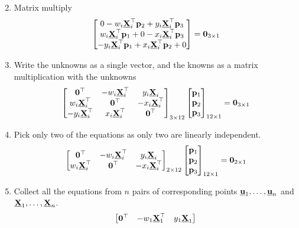 \documentclass{article}
\begin{document}
\begin{enumerate}
\[        \]
      \item Matrix multiply
        \[
          \begin{bmatrix}
            0 -w_i \underline{\mathbf{X}}_i^\top\mathbf{p}_2 + y_i \underline{\mathbf{X}}_i^\top\mathbf{p}_3 \\
            w_i \underline{\mathbf{X}}_i^\top\mathbf{p}_1 + 0  -x_i \underline{\mathbf{X}}_i^\top\mathbf{p}_3 \\
            -y_i \underline{\mathbf{X}}_i^\top\mathbf{p}_1 + x_i \underline{\mathbf{X}}_i^\top\mathbf{p}_2 + 0
          \end{bmatrix} = \mathbf{0}_{3 \times 1}
          \]
        \item Write the unknowns as a single vector, and the knowns as a matrix
          multiplication with the unknowns
          \[
            \begin{bmatrix}
              \mathbf{0}^\top & -w_i \underline{\mathbf{X}}_i^\top & y_i \underline{\mathbf{X}}_i \\
              w_i \underline{\mathbf{X}}_i^\top & \mathbf{0}^\top  & -x_i \underline{\mathbf{X}}_i^\top \\
              -y_i \underline{\mathbf{X}}_i^\top & x_i \underline{\mathbf{X}}_i^\top & \mathbf{0}^\top
              \end{bmatrix}_{3 \times 12}
              \begin{bmatrix}
                \mathbf{p}_1 \\
                \mathbf{p}_2 \\
                \mathbf{p}_3
                \end{bmatrix}_{12 \times 1}
                = \mathbf{0}_{3 \times 1}
            \]
     \item Pick only two of the equations as only two are linearly independent.
       \[
         \begin{bmatrix}
           \mathbf{0}^\top & -w_i \underline{\mathbf{X}}_i^\top & y_i \underline{\mathbf{X}}_i \\
           w_i \underline{\mathbf{X}}_i^\top & \mathbf{0}^\top  & -x_i \underline{\mathbf{X}}_i^\top
         \end{bmatrix}_{2 \times 12}
         \begin{bmatrix}
           \mathbf{p}_1 \\
           \mathbf{p}_2 \\
           \mathbf{p}_3
         \end{bmatrix}_{12 \times 1}
         = \mathbf{0}_{2 \times 1}
       \]
     \item Collect all the equations from $n$ pairs of corresponding points
       $\underline{\mathbf{u}}_1, \dots, \underline{\mathbf{u}}_n$ and $\underline{\mathbf{X}}_1, \dots, \underline{\mathbf{X}}_n$.
       \[
         \begin{bmatrix}
           \mathbf{0}^\top & -w_1 \underline{\mathbf{X}}_1^\top & y_1 \underline{\mathbf{X}}_1 \\

\end{bmatrix}\]
\end{enumerate}
\end{document}
